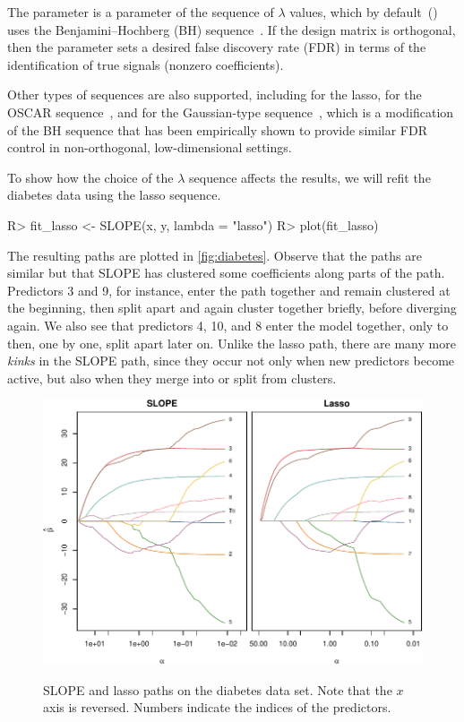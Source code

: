 \documentclass[article]{jss}
\makeatletter
\let\natwidth\Gin@nat@width
\makeatother
\begin{document}
The  parameter is a parameter of the sequence of \(\lambda\) values,
which by default~() uses the Benjamini--Hochberg (BH)
sequence~\citep{bogdan2015}. If the design matrix is orthogonal, then the
 parameter sets a desired false discovery rate (FDR) in terms
of the identification of true signals (nonzero coefficients).

Other types of sequences are also supported,
including  for the lasso,
 for the OSCAR sequence~\citep{bondell2008}, and
 for the Gaussian-type sequence~\citep{bogdan2015},
which is a modification of the BH sequence that has been empirically shown to
provide similar FDR control in non-orthogonal, low-dimensional settings.

To show how the choice of the \(\lambda\) sequence affects the
results, we will refit the diabetes data using the lasso sequence.

\begin{Code}
R> fit_lasso <- SLOPE(x, y, lambda = "lasso")
R> plot(fit_lasso)
\end{Code}

The resulting paths are plotted in \autoref{fig:diabetes}. Observe that the
paths are similar but that SLOPE has clustered
some coefficients along parts of the path. Predictors 3 and 9, for instance,
enter the path together and remain clustered at the beginning, then
split apart and again cluster together briefly, before diverging again.
We also see that predictors 4, 10, and 8 enter the model together, only
to then, one by one, split apart later on. Unlike the lasso path, there
are many more \emph{kinks} in the SLOPE path, since they occur not only when
new predictors become active, but also when they merge into or split
from clusters.

\begin{figure}[tp]
  \centering
  {\includegraphics[width=\natwidth]{images/diabetes-slope-lasso.pdf}}
  \caption{%
    SLOPE and lasso paths on the diabetes
    data set. Note that the \(x\) axis is reversed. Numbers indicate
    the indices of the predictors.
  }
  \label{fig:diabetes}
\end{figure}
\end{document}
